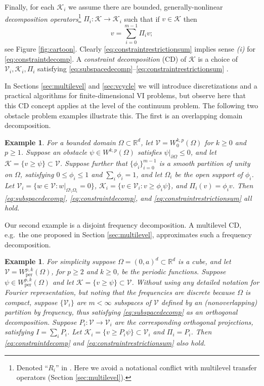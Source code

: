 \documentclass[letterpaper,final,12pt,reqno]{amsart}
\theoremstyle{cstyle}
\theoremstyle{cstyle*}
\theoremstyle{dstyle}
\newtheorem{example}[theorem]{Example}
\numberwithin{equation}{section}
\numberwithin{figure}{section}
\numberwithin{table}{section}
\numberwithin{theorem}{section}
\newcommand{\RR}{\mathbb{R}}
\newcommand{\cK}{\mathcal{K}}
\newcommand{\cV}{\mathcal{V}}
\begin{document}
Finally, for each $\cK_i$ we assume there are bounded, generally-nonlinear \emph{decomposition operators}\footnote{Denoted ``$R_i$'' in \cite{Tai2003}.  Here we avoid a notational conflict with multilevel transfer operators (Section \ref{sec:multilevel}).} $\Pi_i : \cK \to \cK_i$ such that if $v \in \cK$ then
\begin{equation}
v = \sum_{i=0}^{m-1} \Pi_i v;  \label{eq:constraintrestrictionsum}
\end{equation}
see Figure \ref{fig:cartoon}.  Clearly \eqref{eq:constraintrestrictionsum} implies sense \emph{(i)} for \eqref{eq:constraintdecomp}. A \emph{constraint decomposition} (CD) of $\cK$ is a choice of $\cV_i,\cK_i,\Pi_i$ satisfying \eqref{eq:subspacedecomp}--\eqref{eq:constraintrestrictionsum} \cite{Tai2003}.

In Sections \ref{sec:multilevel} and \ref{sec:vcycle} we will introduce discretizations and a practical algorithms for finite-dimensional VI problems, but observe here that this CD concept applies at the level of the continuum problem.  The following two obstacle problem examples illustrate this.  The first is an overlapping domain decomposition.

\begin{example}  \label{ex:domaindecomposition}  For a bounded domain $\Omega \subset \RR^d$, let $\cV = W_0^{k,p}(\Omega)$ for $k\ge 0$ and $p\ge 1$.  Suppose an obstacle $\psi \in W^{k,p}(\Omega)$ satisfies $\psi|_{\partial \Omega} \le 0$, and let $\cK = \{v \ge \psi\} \subset \cV$.  Suppose further that $\{\phi_i\}_{i=0}^{m-1}$ is a smooth partition of unity on $\Omega$, satisfying $0 \le \phi_i\le 1$ and $\sum_i \phi_i = 1$, and let $\Omega_i$ be the open support of $\phi_i$.  Let $\cV_i = \{w \in \cV:w|_{\Omega \setminus \Omega_i} =0 \}$, $\cK_i = \{v \in \cV_i: v \ge \phi_i \psi\}$, and $\Pi_i(v) = \phi_i v$.  Then \eqref{eq:subspacedecomp}, \eqref{eq:constraintdecomp}, and \eqref{eq:constraintrestrictionsum} all hold.
\end{example}

Our second example is a disjoint frequency decomposition.  A multilevel CD, e.g.~the one proposed in Section \ref{sec:multilevel}, approximates such a frequency decomposition.

\begin{example}  \label{ex:frequencydecomposition}  For simplicity suppose $\Omega = (0,a)^d \subset \RR^d$ is a cube, and let $\cV = W_{\text{per}}^{p,k}(\Omega)$, for $p\ge 2$ and $k\ge 0$, be the periodic functions.  Suppose $\psi \in W_{\text{per}}^{p,k}(\Omega)$ and let $\cK = \{v \ge \psi\} \subset \cV$.  Without using any detailed notation for Fourier representation, but noting that the frequencies are discrete because $\Omega$ is compact, suppose $\{\cV_i\}$ are $m<\infty$ subspaces of $\cV$ defined by an (nonoverlapping) partition by frequency, thus satisfying \eqref{eq:subspacedecomp} as an orthogonal decomposition.  Suppose $P_i:\cV \to \cV_i$ are the corresponding orthogonal projections, satisfying $I = \sum_i P_i$.  Let $\cK_i = \{v \ge P_i \psi\} \subset \cV_i$ and $\Pi_i = P_i$.  Then \eqref{eq:constraintdecomp} and \eqref{eq:constraintrestrictionsum} also hold.
\end{example}
\end{document}
